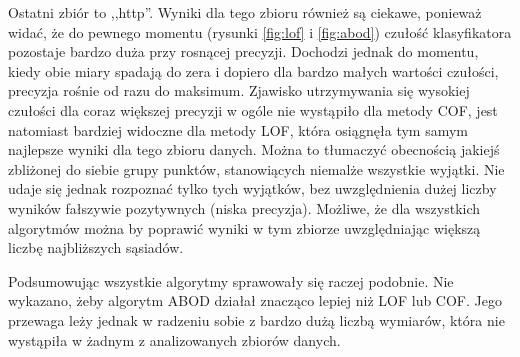 \documentclass{classrep}
\begin{document}
{        Ostatni zbiór to ,,http''. Wyniki dla tego zbioru również są
        ciekawe, ponieważ widać, że do pewnego momentu (rysunki
        \ref{fig:lof} i \ref{fig:abod}) czułość klasyfikatora pozostaje
        bardzo duża przy rosnącej precyzji. Dochodzi jednak do momentu,
        kiedy obie miary spadają do zera i dopiero dla bardzo małych
        wartości czułości, precyzja rośnie od razu do maksimum. Zjawisko
        utrzymywania się wysokiej czułości dla coraz większej precyzji w
        ogóle nie wystąpiło dla metody COF, jest natomiast bardziej
        widoczne dla metody LOF, która osiągnęła tym samym najlepsze wyniki
        dla tego zbioru danych. Można to tłumaczyć obecnością jakiejś
        zbliżonej do siebie grupy punktów, stanowiących niemalże wszystkie
        wyjątki. Nie udaje się jednak rozpoznać tylko tych wyjątków, bez
        uwzględnienia dużej liczby wyników fałszywie pozytywnych (niska
        precyzja). Możliwe, że dla wszystkich algorytmów można by poprawić
        wyniki w tym zbiorze uwzględniając większą liczbę najbliższych
        sąsiadów.

        Podsumowując wszystkie algorytmy sprawowały się raczej podobnie.
        Nie wykazano, żeby algorytm ABOD działał znacząco lepiej niż LOF
        lub COF. Jego przewaga leży jednak w radzeniu sobie z bardzo dużą
        liczbą wymiarów, która nie wystąpiła w żadnym z analizowanych
        zbiorów danych.
    }

    \begin{thebibliography}{0}
    \end{thebibliography}
\end{document}

